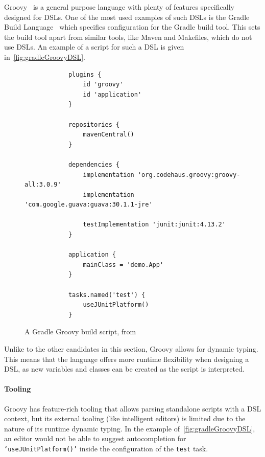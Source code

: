 Groovy~\cite{groovyLangIndex} is a general purpose language with plenty of features specifically designed for DSLs.
One of the most used examples of such DSLs is the Gradle Build Language~\cite{gradleDSL} which specifies configuration for the Gradle build tool.
This sets the build tool apart from similar tools, like Maven and Makefiles, which do not use DSLs.
An example of a script for such a DSL is given in~\autoref{fig:gradleGroovyDSL}.

\begin{figure}[h]
    \centering
    \begin{minipage}{0.8\textwidth}
        \begin{verbatim}
            plugins {
                id 'groovy'
                id 'application'
            }

            repositories {
                mavenCentral()
            }

            dependencies {
                implementation 'org.codehaus.groovy:groovy-all:3.0.9'
                implementation 'com.google.guava:guava:30.1.1-jre'

                testImplementation 'junit:junit:4.13.2'
            }

            application {
                mainClass = 'demo.App'
            }

            tasks.named('test') {
                useJUnitPlatform()
            }
        \end{verbatim}
    \end{minipage}
    \caption[Gradle Groovy Build script]
    {A Gradle Groovy build script, from~\cite{gradleDSL}}
    \label{fig:gradleGroovyDSL}
\end{figure}

Unlike to the other candidates in this section, Groovy allows for dynamic typing.
This means that the language offers more runtime flexibility when designing a DSL, as new variables and classes can be created as the script is interpreted.

\paragraph{Tooling} Groovy has feature-rich tooling that allows parsing standalone scripts with a DSL context, but its external tooling (like intelligent editors) is limited due to the nature of its runtime dynamic typing.
In the example of~\autoref{fig:gradleGroovyDSL}, an editor would not be able to suggest autocompletion for \texttt{`useJUnitPlatform()'} inside the configuration of the \texttt{test} task.

